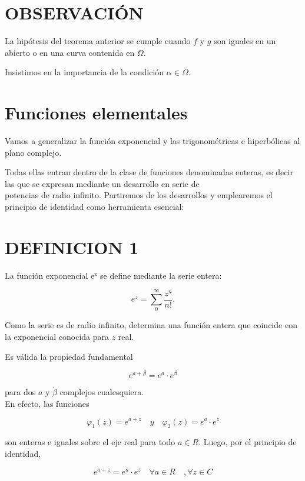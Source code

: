\documentclass[10pt]{article}
\theoremstyle{plain}
\theoremstyle{definition}
\theoremstyle{remark}
\begin{document}
\section*{OBSERVACIÓN}
La hipótesis del teorema anterior se cumple cuando $f$ y $g$ son iguales en un abierto o en una curva contenida en $\Omega$.

Insistimos en la importancia de la condición $\alpha \in \Omega$.

\section{Funciones elementales}
Vamos a generalizar la función exponencial y las trigonométricas e hiperbólicas al plano complejo.

Todas ellas entran dentro de la clase de funciones denominadas enteras, es decir las que se expresan mediante un desarrollo en serie de\\
potencias de radio infinito. Partiremos de los desarrollos y emplearemos el principio de identidad como herramienta esencial:

\section*{DEFINICION 1}
La función exponencial $\mathrm{e}^{\mathrm{z}}$ se define mediante la serie entera:


\begin{equation*}
e^{z}=\sum_{0}^{\infty} \frac{z^{n}}{n!} . \tag{12-1}
\end{equation*}


Como la serie es de radio infinito, determina una función entera que coincide con la exponencial conocida para $z$ real.

Es válida la propiedad fundamental


\begin{equation*}
e^{a+\beta}=e^{a} \cdot e^{\beta} \tag{12-2}
\end{equation*}


para dos $a$ y $\dot{\beta}$ complejos cualesquiera.\\
En efecto, las funciones

$$
\varphi_{1}(z)=e^{a+z} \quad y \quad \varphi_{2}(z)=e^{a} \cdot e^{z}
$$

son enteras e iguales sobre el eje real para todo $a \in R$. Luego, por el principio de identidad,

$$
e^{a+z}=e^{a} \cdot e^{z} \quad \forall a \in R \quad, \forall z \in C
$$
\end{document}
